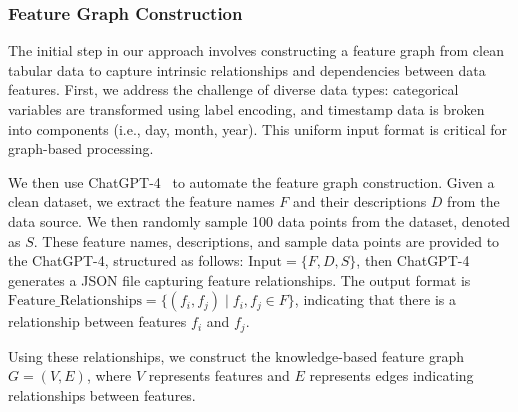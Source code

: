 \subsubsection{\textbf{Feature Graph Construction}}

The initial step in our approach involves constructing a feature graph from clean tabular data to capture intrinsic relationships and dependencies between data features.
First, we address the challenge of diverse data types: categorical variables are transformed using label encoding, and timestamp data is broken into components (i.e., day, month, year). 
This uniform input format is critical for graph-based processing.

We then use ChatGPT-4~\cite{openai2024gpt4} to automate the feature graph construction. 
Given a clean dataset, we extract the feature names \( F \) and their descriptions \( D \) from the data source. We then randomly sample 100 data points from the dataset, denoted as \( S \). These feature names, descriptions, and sample data points are provided to the ChatGPT-4, structured as follows: \(\text{Input} = \{ F, D, S \}\), then ChatGPT-4 generates a JSON file capturing feature relationships.
The output format is \(\text{Feature\_Relationships} = \{ (f_i, f_j) \mid f_i, f_j \in F \}\), indicating that there is a relationship between features \( f_i \) and \( f_j \).

Using these relationships, we construct the knowledge-based feature graph \( G = (V, E) \), where \( V \) represents features and \( E \) represents edges indicating relationships between features.




